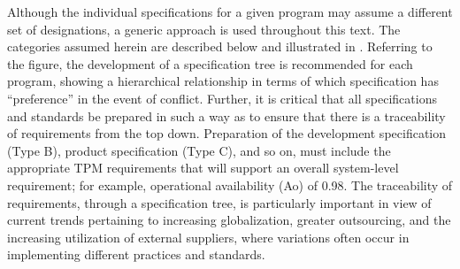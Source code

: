 Although the individual specifications for a given program may assume a different set of designations, a generic approach is used throughout this text. The categories assumed herein are described below and illustrated in . Referring to the figure, the development of a specification tree is recommended for each program, showing a hierarchical relationship in terms of which specification has ``preference'' in the event of conflict. Further, it is critical that all specifications and standards be prepared in such a way as to ensure that there is a traceability of requirements from the top down. Preparation of the development specification (Type B), product specification (Type C), and so on, must include the appropriate TPM requirements that will support an overall system-level requirement; for example, operational availability (Ao) of 0.98. The traceability of requirements, through a specification tree, is particularly important in view of current trends pertaining to increasing globalization, greater outsourcing, and the increasing utilization of external suppliers, where variations often occur in implementing different practices and standards.

